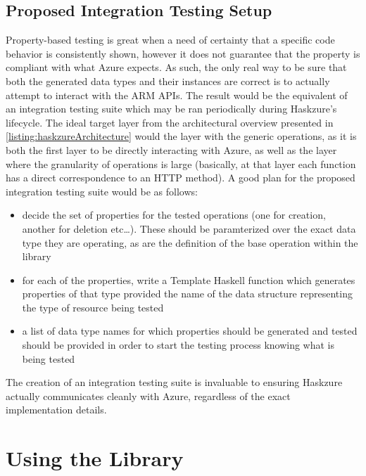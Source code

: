 \documentclass[11pt]{report}
\begin{document}
\section{Proposed Integration Testing Setup}

Property-based testing is great when a need of certainty that a specific
code behavior is consistently shown, however it does not guarantee that the
property is compliant with what Azure expects. As such, the only real way to
be sure that both the generated data types and their instances are correct is
to actually attempt to interact with the ARM APIs. \newline
The result would be the equivalent of an integration testing suite which may be
ran periodically during Haskzure's lifecycle. The ideal target layer from the
architectural overview presented in \autoref{listing:haskzureArchitecture}
would the layer with the generic operations, as it is both the first layer to
be directly interacting with Azure, as well as the layer where the granularity
of operations is large (basically, at that layer each function has a direct
correspondence to an HTTP method). \newline
A good plan for the proposed integration testing suite would be as follows:

\begin{itemize}
    \item{} decide the set of properties for the tested operations (one for
        creation, another for deletion etc\ldots). These should be paramterized
        over the exact data type they are operating, as are the definition of
        the base operation within the library
    \item{} for each of the properties, write a Template Haskell function which
        generates properties of that type provided the name of the
        data structure representing the type of resource being tested
    \item{} a list of data type names for which properties should be
        generated and tested should be provided in order to start the testing
        process knowing what is being tested
\end{itemize}

The creation of an integration testing suite is invaluable to ensuring
Haskzure actually communicates cleanly with Azure, regardless of the exact
implementation details.

\chapter{Using the Library}
\end{document}

